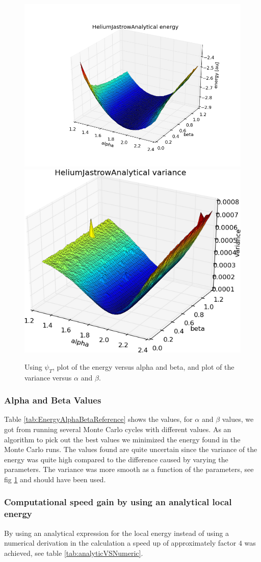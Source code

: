		\begin{figure}
			\centering \includegraphics[width=0.49\linewidth]{../figures/HeliumJastrowAnalytical_alpha_beta_energy}
			\includegraphics[width=0.49\linewidth]{../figures/HeliumJastrowAnalytical_alpha_beta_variance}
			\protect\caption{Using $\psi_{T}$, plot of the energy versus alpha and beta, and plot of the variance versus $\alpha$ and $\beta$. }
			\label{fig:HeliumAlphaBeta}
		\end{figure}


		\subsubsection{Alpha and Beta Values}

			Table \ref{tab:EnergyAlphaBetaReference} shows the values, for \(\alpha\) and \(\beta\) values, we got from  running several Monte Carlo cycles with different values. As an algorithm to pick out the best values we minimized the energy found in the Monte Carlo runs. The values found are quite uncertain since the variance of the energy was quite high compared to the difference caused by varying the parameters. The variance was more smooth as a function of the parameters, see fig \ref{fig:HeliumAlphaBeta} and should have been used.




		\subsubsection{Computational speed gain by using an analytical local energy}
			By using an analytical expression for the local energy instead of using a numerical derivation in the calculation a speed up of approximately factor \(4\) was achieved, see table \ref{tab:analyticVSNumeric}.

